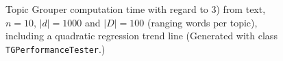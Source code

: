 \documentclass[10pt, a4paper, oneside]{article}
\begin{document}
\begin{figure}
\caption{Topic Grouper computation time with regard to 3) from text, $n = 10$, $|d| = 1000$ and $|D| = 100$ (ranging words per topic), including a quadratic regression trend line (Generated with class \texttt{TGPerformanceTester}.)}
\label{perf1}
\end{figure}
\end{document}
